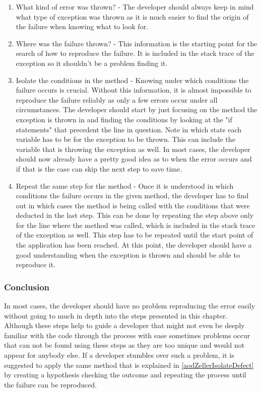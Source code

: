 \begin{enumerate}
  \item What kind of error was thrown? - The developer should always keep in mind what type of exception was thrown as it is much easier to find the origin of the failure when knowing what to look for.
  \item Where was the failure thrown? - This information is the starting point for the search of how to reproduce the failure. It is included in the stack trace of the exception so it shouldn't be a problem finding it.
  \item Isolate the conditions in the method - Knowing under which conditions the failure occurs is crucial. Without this information, it is almost impossible to reproduce the failure reliably as only a few errors occur under all circumstances. The developer should start by just focusing on the method the exception is thrown in and finding the conditions by looking at the "if statements" that precedent the line in question. Note in which state each variable has to be for the exception to be thrown. This can include the variable that is throwing the exception as well. In most cases, the developer should now already have a pretty good idea as to when the error occurs and if that is the case can skip the next step to save time.
  \item Repeat the same step for the method - Once it is understood in which conditions the failure occurs in the given method, the developer has to find out in which cases the method is being called with the conditions that were deducted in the last step. This can be done by repeating the step above only for the line where the method was called, which is included in the stack trace of the exception as well. This step has to be repeated until the start point of the application has been reached. At this point, the developer should have a good understanding when the exception is thrown and should be able to reproduce it.
\end{enumerate}

\subsubsection{Conclusion}
In most cases, the developer should have no problem reproducing the error easily without going to much in depth into the steps presented in this chapter. Although these steps help to guide a developer that might not even be deeply familiar with the code through the process with ease sometimes problems occur that can not be found using these steps as they are too unique and would not appear for anybody else. If a developer stumbles over such a problem, it is suggested to apply the same method that is explained in \ref{aodZellerIsolateDefect} by creating a hypothesis checking the outcome and repeating the process until the failure can be reproduced.

